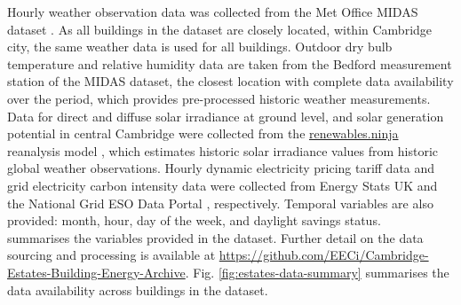 Hourly weather observation data was collected from the Met Office MIDAS dataset \cite{metoffice2022MIDASOpenUK}. As all buildings in the dataset are closely located, within Cambridge city, the same weather data is used for all buildings. Outdoor dry bulb temperature and relative humidity data are taken from the Bedford measurement station of the MIDAS dataset, the closest location with complete data availability over the period, which provides pre-processed historic weather measurements. Data for direct and diffuse solar irradiance at ground level, and solar generation potential in central Cambridge were collected from the \href{https://www.renewables.ninja/}{renewables.ninja} reanalysis model \citep{pfenninger2016LongtermPatternsEuropean,staffell2016UsingBiascorrectedReanalysis}, which estimates historic solar irradiance values from historic global weather observations. Hourly dynamic electricity pricing tariff data and grid electricity carbon intensity data were collected from Energy Stats UK \citep{energystatsuk2023HistoricalPricingData} and the National Grid ESO Data Portal \citep{nationalgrideso2020HistoricGenerationMix}, respectively. Temporal variables are also provided: month, hour, day of the week, and daylight savings status.\\

 summarises the variables provided in the dataset. Further detail on the data sourcing and processing is available at \url{https://github.com/EECi/Cambridge-Estates-Building-Energy-Archive}. Fig. \ref{fig:estates-data-summary} summarises the data availability across buildings in the dataset.\\

